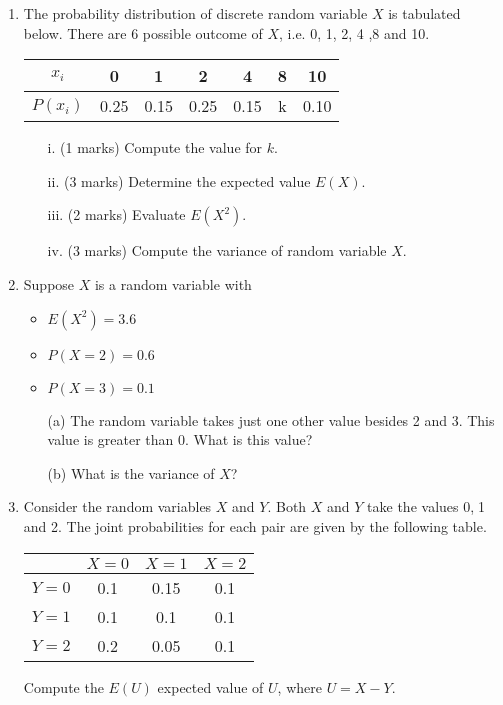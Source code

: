 \documentclass[]{report}
\begin{document}
\begin{enumerate}
	\item  The probability distribution of discrete random variable $X$ is tabulated below. There are 6 possible outcome of $X$, i.e. 0, 1, 2, 4 ,8 and 10.
	\begin{center}
		\begin{tabular}{|c||c|c|c|c|c|c|}
			\hline
			$x_i$  & 0 & 1 & 2 & 4 & 8 & 10 \\\hline
			$P(x_i)$ & 0.25 & 0.15 & 0.25 & 0.15 & k & 0.10\\
			\hline
		\end{tabular}
	\end{center}
	
	\begin{itemize}
		\item[i.] (1 marks) Compute the value for $k$.
		\item[ii.] (3 marks) Determine the expected value $E(X)$.
		\item[iii.] (2 marks) Evaluate $E(X^2)$.
		\item[iv.] (3 marks) Compute the variance of random variable $X$.
	\end{itemize}
	\item 
	Suppose $X$ is a random variable with 
	\begin{itemize}
		\item $E(X^2)=3.6$
		\item $P(X=2)=0.6$
		\item $P(X=3)=0.1$
	\end{itemize}
	
	\begin{itemize}
		\item[(a)] The random variable takes just one other value besides 2 and 3. This value is greater than 0. What is this value?
		\item[(b)] What is the variance of $X$?
	\end{itemize}
	
	
	\item Consider the random variables $X$ and $Y$. Both $X$ and $Y$ take the values 0,$\;$1 and 2. 
	The joint probabilities for each pair are given by the following table.
	\begin{center}
		\begin{tabular}{|c|c|c|c|}
			\hline  & $X=0$ & $X=1$ & $X=2$ \\ 
			\hline $Y=0$ & 0.1 & 0.15 & 0.1 \\ 
			\hline $Y=1$ & 0.1 & 0.1 & 0.1 \\ 
			\hline $Y=2$ & 0.2 & 0.05 & 0.1 \\ 
			\hline 
		\end{tabular} 
	\end{center}
	Compute the $E(U)$ expected value of $U$, where $U=X-Y$.
\end{enumerate}
	
\end{document}
